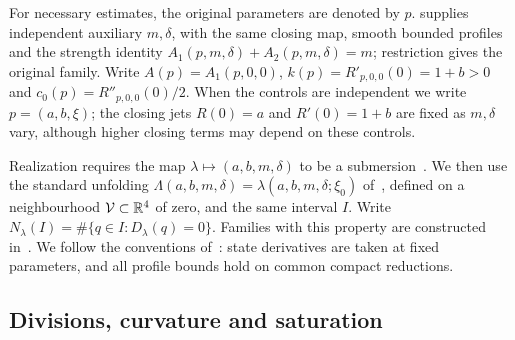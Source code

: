 For necessary estimates, the original parameters are denoted by $p$.
\cite[Lemma~\ref*{main-lem:auxiliary-controls}]{main2026} supplies
independent auxiliary $m,\delta$, with the same closing map, smooth bounded
profiles and the strength identity
$A_1(p,m,\delta)+A_2(p,m,\delta)=m$; restriction gives
the original family. Write $A(p)=A_1(p,0,0)$,
$k(p)=R'_{p,0,0}(0)=1+b>0$ and $c_0(p)=R''_{p,0,0}(0)/2$.
When the controls are independent we write $p=(a,b,\xi)$; the closing
jets $R(0)=a$ and $R'(0)=1+b$ are fixed as $m,\delta$ vary, although
higher closing terms may depend on these controls.

Realization requires the map $\lambda\mapsto(a,b,m,\delta)$ to be a
submersion~\cite[(\ref*{main-eq:rank})]{main2026}. We then use the standard
unfolding $\Lambda(a,b,m,\delta)=\lambda(a,b,m,\delta;\xi_0)$
of~\cite{main2026}, defined on a neighbourhood $\mathcal V\subset\mathbb R^4$ of
zero, and the same interval $I$. Write
$N_\lambda(I)=\#\{q\in I:D_\lambda(q)=0\}$. Families with this property are
constructed in~\cite[Proposition~\ref*{main-prop:specified-rank} and
Theorem~\ref*{main-thm:harvesting-realization}]{main2026}. We follow the
conventions of~\cite[Section~2]{main2026}: state
derivatives are taken at fixed parameters, and all profile bounds hold on
common compact reductions.

\subsection{Divisions, curvature and saturation}

